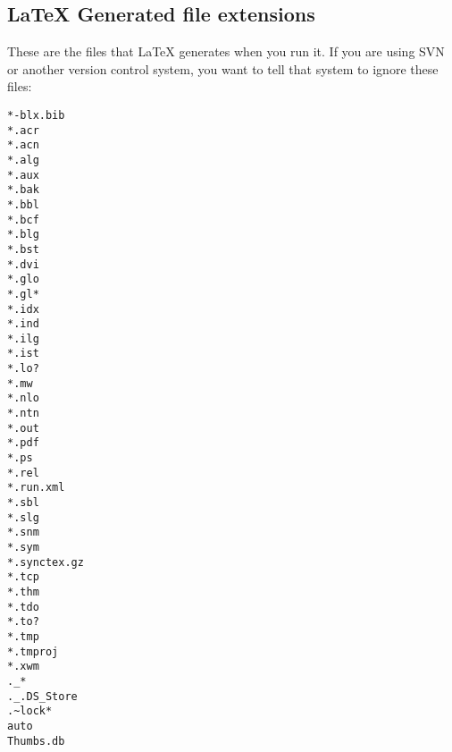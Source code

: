 \subsection{LaTeX Generated file extensions}\label{appendix:latex-gen}
These are the files that \LaTeX{} generates when you run it.
If you are using SVN or another version control system, you want to tell that system to ignore these files:
  \begin{verbatim}
*-blx.bib
*.acr
*.acn
*.alg
*.aux
*.bak
*.bbl
*.bcf
*.blg
*.bst
*.dvi
*.glo
*.gl*
*.idx
*.ind
*.ilg
*.ist
*.lo?
*.mw
*.nlo
*.ntn
*.out
*.pdf
*.ps
*.rel
*.run.xml
*.sbl
*.slg
*.snm
*.sym
*.synctex.gz
*.tcp
*.thm
*.tdo
*.to?
*.tmp
*.tmproj
*.xwm
._*
._.DS_Store
.~lock*
auto
Thumbs.db
\end{verbatim}

%

